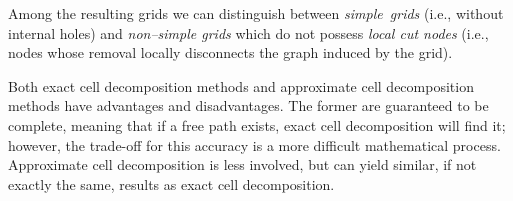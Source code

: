 Among the resulting grids we can distinguish between \mbox{\textit{simple grids}} (i.e., without internal holes) and \textit{non--simple grids} which do not possess \textit{local cut nodes} (i.e., nodes whose removal locally disconnects the graph induced by the grid). 


Both exact cell decomposition methods and approximate cell decomposition methods have advantages and disadvantages. The former are guaranteed to be complete, meaning that if a free path exists, exact cell decomposition will find it; however, the trade-off for this accuracy is a more difficult mathematical process. Approximate cell decomposition is less involved, but can yield similar, if not exactly the same, results as exact cell decomposition.

